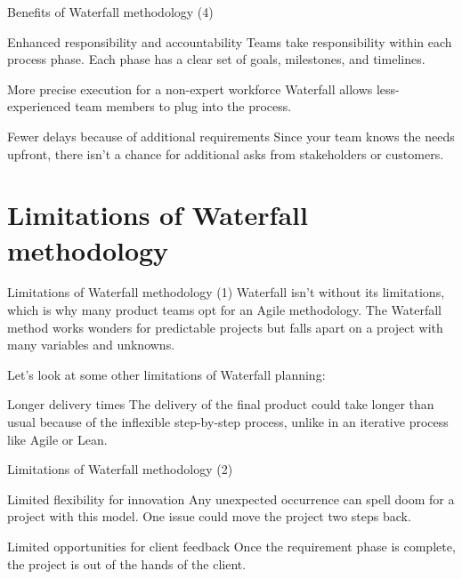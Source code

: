 \documentclass[
    notheorems,
    11pt,
    compress,
    aspectratio=169
]{beamer}
\begin{document}
\begin{frame}{Benefits of Waterfall methodology (4)}
    \begin{block}{Enhanced responsibility and accountability}
        Teams take responsibility within each process phase. Each phase has a clear set of goals, milestones, and timelines.
    \end{block}

    \pause
    \vfill
    
    \begin{block}{More precise execution for a non-expert workforce}
        Waterfall allows less-experienced team members to plug into the process.
    \end{block}

    \pause
    \vfill

    \begin{block}{Fewer delays because of additional requirements}
        Since your team knows the needs upfront, there isn’t a chance for additional asks from stakeholders or customers.
    \end{block}
\end{frame}


\section{Limitations of Waterfall methodology}

\begin{frame}{Limitations of Waterfall methodology (1)}
    Waterfall isn’t without its limitations, which is why many product teams opt for an Agile methodology. The Waterfall method works wonders for predictable projects but falls apart on a project with many variables and unknowns.

    \pause
    \vspace{\baselineskip}

    Let’s look at some other limitations of Waterfall planning:

    \begin{block}{Longer delivery times}
        The delivery of the final product could take longer than usual because of the inflexible step-by-step process, unlike in an iterative process like Agile or Lean.
    \end{block}
\end{frame}

\begin{frame}{Limitations of Waterfall methodology (2)}
    \begin{block}{Limited flexibility for innovation}
        Any unexpected occurrence can spell doom for a project with this model. One issue could move the project two steps back.
    \end{block}

    \pause
    \vfill

    \begin{block}{Limited opportunities for client feedback}
        Once the requirement phase is complete, the project is out of the hands of the client.
    \end{block}
\end{frame}
\end{document}

